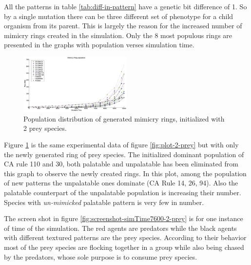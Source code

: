 \documentclass[letterpaper]{article}
\numberwithin{equation}{section}
\begin{document}
All the patterns in table \ref{tab:diff-in-pattern} have a genetic bit difference of 1. So by a single mutation there can be three different set of phenotype for a child organism from its parent. This is largely the reason for the increased number of mimicry rings created in the simulation. Only the 8 most populous rings are presented in the graphs with population verses simulation time.

\begin{figure}[H]
	\centering
	\includegraphics[width=0.5\textwidth]{../tex/images/simTime10k-2Prey-generated-prey}
	\caption[Population distribution of generated mimicry rings (2 prey species)]{Population distribution of generated mimicry rings, initialized with 2 prey species.}
	\label{fig:plot-2-prey-generated-prey}
\end{figure}

Figure \ref{fig:plot-2-prey-generated-prey} is the same experimental data of figure \ref{fig:plot-2-prey} but with only the newly generated ring of prey species. The initialized dominant population of CA rule 110 and 30, both palatable and unpalatable has been eliminated from this graph to observe the newly created rings. In this plot, among the population of new patterns the unpalatable ones dominate (CA Rule 14, 26, 94). Also the palatable counterpart of the unpalatable population is increasing their number. Species with \textsl{un-mimicked} palatable pattern is very few in number.

The screen shot in figure \ref{fig:screenshot-simTime7600-2-prey} is for one instance of time of the simulation. The red agents are predators while the black agents with different textured patterns are the prey species. According to their behavior most of the prey species are flocking together in a group while also being chased by the predators, whose sole purpose is to consume prey species. 
\end{document}
